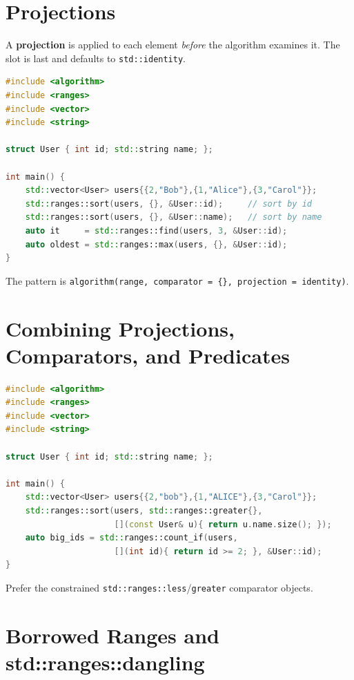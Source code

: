 \section{Projections}
\label{sec:c20-projections}

A \textbf{projection} is applied to each element \emph{before} the algorithm examines it. The slot is last and defaults to \texttt{std::identity}.

\begin{lstlisting}[language=C++,caption={Sort/find by a member using a projection}]
#include <algorithm>
#include <ranges>
#include <vector>
#include <string>

struct User { int id; std::string name; };

int main() {
    std::vector<User> users{{2,"Bob"},{1,"Alice"},{3,"Carol"}};
    std::ranges::sort(users, {}, &User::id);     // sort by id
    std::ranges::sort(users, {}, &User::name);   // sort by name
    auto it     = std::ranges::find(users, 3, &User::id);
    auto oldest = std::ranges::max(users, {}, &User::id);
}
\end{lstlisting}

The pattern is \texttt{algorithm(range, comparator = \{\}, projection = identity)}.

\section{Combining Projections, Comparators, and Predicates}
\label{sec:c20-proj-combine}

\begin{lstlisting}[language=C++,caption={Projection + comparator, and projection + predicate}]
#include <algorithm>
#include <ranges>
#include <vector>
#include <string>

struct User { int id; std::string name; };

int main() {
    std::vector<User> users{{2,"bob"},{1,"ALICE"},{3,"Carol"}};
    std::ranges::sort(users, std::ranges::greater{},
                      [](const User& u){ return u.name.size(); });
    auto big_ids = std::ranges::count_if(users,
                      [](int id){ return id >= 2; }, &User::id);
}
\end{lstlisting}

Prefer the constrained \texttt{std::ranges::less}/\texttt{greater} comparator objects.

\section{Borrowed Ranges and std::ranges::dangling}
\label{sec:c20-dangling}

